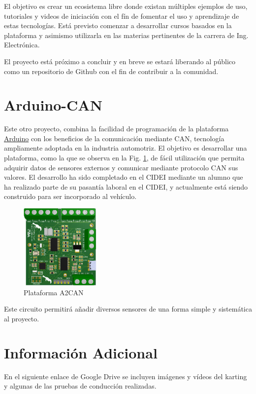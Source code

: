\documentclass[a4paper]{article}
\begin{document}
El objetivo es crear un ecosistema libre donde existan múltiples ejemplos de uso, tutoriales y videos de iniciación con el fín de fomentar el uso y aprendizaje de estas tecnologías. Está previsto comenzar a desarrollar cursos basados en la plataforma y asimismo utilizarla en las materias pertinentes de la carrera de Ing. Electrónica.

El proyecto está próximo a concluir y en breve se estará liberando al público como un repositorio de Github con el fin de contribuir a la comunidad.

\section{Arduino-CAN}
Este otro proyecto, combina la facilidad de programación de la plataforma \href{http://arduino.cc}{Arduino} con los beneficios de la comunicación mediante CAN, tecnología ampliamente adoptada en la industria automotriz. El objetivo es desarrollar una plataforma, como la que se observa en la Fig. \ref{fig:a2can}, de fácil utilización que permita adquirir datos de sensores externos y comunicar mediante protocolo CAN sus valores. El desarrollo ha sido completado en el CIDEI mediante un alumno que ha realizado parte de su pasantía laboral en el CIDEI, y actualmente está siendo construido para ser incorporado al vehículo.
%
\begin{figure}[h]
    \centering
    \includegraphics[width=0.35\textwidth]{figs/a2can.png}
    \caption{Plataforma A2CAN}
    \label{fig:a2can}
\end{figure}

Este circuito permitirá añadir diversos sensores de una forma simple y sistemática al proyecto.

\section{Información Adicional}
En el siguiente enlace de Google Drive \texttrademark se incluyen imágenes y vídeos del karting y algunas de las pruebas de conducción realizadas. 
\end{document}
